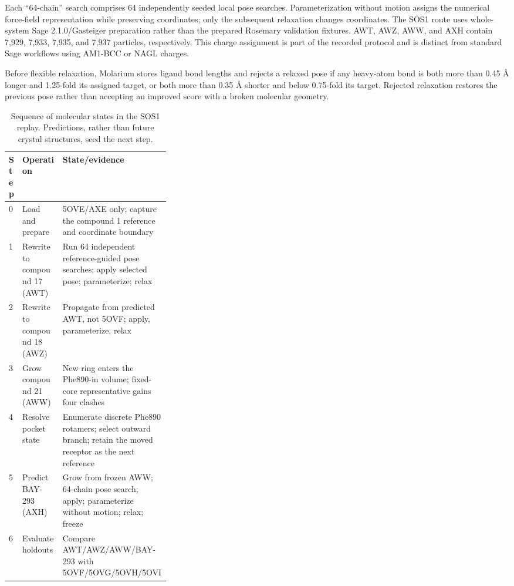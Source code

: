 \documentclass[11pt]{article}
\begin{document}
\begin{small}
Each ``64-chain'' search comprises 64 independently seeded local pose searches. Parameterization without motion assigns the numerical force-field representation while preserving coordinates; only the subsequent relaxation changes coordinates. The SOS1 route uses whole-system Sage 2.1.0/Gasteiger preparation rather than the prepared Rosemary validation fixtures. AWT, AWZ, AWW, and AXH contain 7,929, 7,933, 7,935, and 7,937 particles, respectively. This charge assignment is part of the recorded protocol and is distinct from standard Sage workflows using AM1-BCC or NAGL charges.

Before flexible relaxation, Molarium stores ligand bond lengths and rejects a relaxed pose if any heavy-atom bond is both more than 0.45 \AA{} longer and 1.25-fold its assigned target, or both more than 0.35 \AA{} shorter and below 0.75-fold its target. Rejected relaxation restores the previous pose rather than accepting an improved score with a broken molecular geometry.

\begin{table}[htbp]
\centering\small
\caption{Sequence of molecular states in the SOS1 replay. Predictions, rather than future crystal structures, seed the next step.}
\label{tab:appA_sos1_beats}
\begin{tabularx}{\linewidth}{@{}p{0.07\linewidth}p{0.25\linewidth}X@{}}
\toprule
\textbf{Step} & \textbf{Operation} & \textbf{State/evidence}\\
\midrule
0 & Load and prepare & 5OVE/AXE only; capture the compound 1 reference and coordinate boundary\\
1 & Rewrite to compound 17 (AWT) & Run 64 independent reference-guided pose searches; apply selected pose; parameterize; relax\\
2 & Rewrite to compound 18 (AWZ) & Propagate from predicted AWT, not 5OVF; apply, parameterize, relax\\
3 & Grow compound 21 (AWW) & New ring enters the Phe890-in volume; fixed-core representative gains four clashes\\
4 & Resolve pocket state & Enumerate discrete Phe890 rotamers; select outward branch; retain the moved receptor as the next reference\\
5 & Predict BAY-293 (AXH) & Grow from frozen AWW; 64-chain pose search; apply; parameterize without motion; relax; freeze\\
6 & Evaluate holdouts & Compare AWT/AWZ/AWW/BAY-293 with 5OVF/5OVG/5OVH/5OVI\\
\bottomrule
\end{tabularx}
\end{table}


\end{small}
\end{document}
